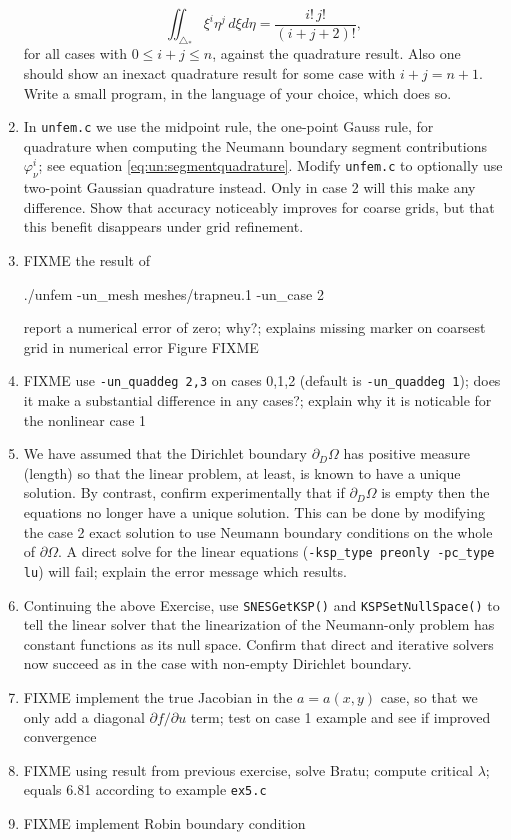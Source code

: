 \begin{enumerate}
\begin{equation}
\iint_{\triangle_\ast} \xi^i \eta^j\,d\xi d\eta = \frac{i!\,j!}{(i+j+2)!}, \label{eq:un:checkquadrature}
\end{equation}
for all cases with $0\le i+j\le n$, against the quadrature result.  Also one should show an inexact quadrature result for some case with $i+j=n+1$.  Write a small program, in the language of your choice, which does so.
\item \label{exer:un:gaussneumann}  In \texttt{unfem.c} we use the midpoint rule, the one-point Gauss rule, for quadrature when computing the Neumann boundary segment contributions $\varphi_\nu^i$; see equation \eqref{eq:un:segmentquadrature}.  Modify \texttt{unfem.c} to optionally use two-point Gaussian quadrature instead.  Only in case 2 will this make any difference.  Show that accuracy noticeably improves for coarse grids, but that this benefit disappears under grid refinement.
\item FIXME the result of
\begin{cline}
./unfem -un_mesh meshes/trapneu.1 -un_case 2
\end{cline}
report a numerical error of zero; why?; explains missing marker on coarsest grid in numerical error Figure FIXME
\item FIXME use \texttt{-un_quaddeg 2,3} on cases 0,1,2 (default is \texttt{-un_quaddeg 1}); does it make a substantial difference in any cases?; explain why it is noticable for the nonlinear case 1
\item \label{exer:un:allneumannfailure}  We have assumed that the Dirichlet boundary $\partial_D \Omega$ has positive measure (length) so that the linear problem, at least, is known to have a unique solution.  By contrast, confirm experimentally that if $\partial_D\Omega$ is empty then the equations no longer have a unique solution.  This can be done by modifying the case 2 exact solution to use Neumann boundary conditions on the whole of $\partial \Omega$.  A direct solve for the linear equations (\texttt{-ksp\_type preonly -pc\_type lu}) will fail; explain the error message which results.
\item \label{exer:un:allneumannresolution}  Continuing the above Exercise, use \texttt{SNESGetKSP()} and \texttt{KSPSetNullSpace()} to tell the linear solver that the linearization of the Neumann-only problem has constant functions as its null space.  Confirm that direct and iterative solvers now succeed as in the case with non-empty Dirichlet boundary.
\item \label{exer:un:truejacobian} FIXME implement the true Jacobian in the $a=a(x,y)$ case, so that we only add a diagonal $\partial f/\partial u$ term; test on case 1 example and see if improved \pSNES convergence
\item \label{exer:un:bratu} FIXME using result from previous exercise, solve Bratu; compute critical $\lambda$; equals 6.81 according to \pSNES example \texttt{ex5.c}
\item \label{exer:un:robin} FIXME implement Robin boundary condition
\end{enumerate}

